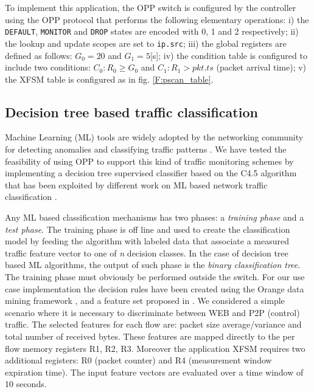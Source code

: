 \documentclass{sig-alternate}
\begin{document}
To implement this application, the OPP switch is configured by the controller using the OPP protocol that performs the following elementary operations: i) the \texttt{DEFAULT},  \texttt{MONITOR} and  \texttt{DROP} states are encoded with 0, 1 and 2 respectively; ii) the lookup and update scopes are set to \texttt{ip.src}; iii) the global registers are defined as follows: $G_0 = 20$ and $G_1 = 5$[s]; iv) the condition table is configured to include two conditions: $C_0: R_0 \ge G_0$ and $C_1: R_1 > pkt.ts$ (packet arrival time); v) the XFSM table is configured as in fig. \ref{F:pscan_table}.

\subsection{Decision tree based traffic classification}
Machine Learning (ML) tools are widely adopted by the networking  community for detecting anomalies and classifying traffic patterns \cite{nguyen2008survey}. We have tested the feasibility of using OPP to support this kind of traffic monitoring schemes by implementing a decision tree supervised classifier based on the C4.5 algorithm \cite{quinlan2014c4} that has been exploited by different work on ML based network traffic classification \cite{williams2006preliminary,pan2003hybrid,ma2008study,zhang2010method,li2007machine,alshammari2009machine}.

Any ML based classification mechanisms has two phases: a {\em training phase} and a {\em test phase}. The training phase is off line and used to create the classification model by feeding the algorithm with labeled data that associate a measured traffic feature vector to one of {\em n} decision classes. In the case of decision tree based ML algorithms, the output of such phase is the {\em binary classification tree}. The training phase must obviously be performed outside the switch. For our use case implementation the decision rules have been created using the Orange data mining framework \cite{JMLR:demsar13a}, and a feature set proposed in  \cite{li2007accurate}. We considered a simple scenario where it is necessary to discriminate between WEB and P2P (control) traffic. The selected features for each flow are: packet size average/variance and total number of received bytes. These features are mapped directly to the per flow memory registers R1, R2, R3. Moreover the application XFSM requires two additional registers: R0 (packet counter) and R4 (measurement window expiration time). The input feature vectors are evaluated over a time window of 10 seconds.
\end{document}
